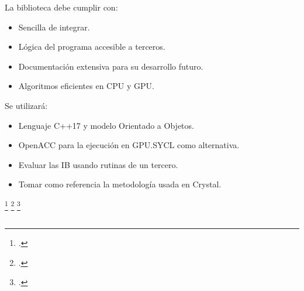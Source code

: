 \documentclass[dvisvgm,11pt,aspectratio=169]{beamer}
\begin{document}
\begin{frame}
\begin{columns}
\begin{column}{0.8\textwidth}
	La biblioteca debe cumplir con:
	\begin{itemize}
		\item Sencilla de integrar.
		\item Lógica del programa accesible a terceros. 
		\item Documentación extensiva para su desarrollo futuro.
		\item Algoritmos eficientes en CPU y GPU.
	\end{itemize}
	Se utilizará:
	\begin{itemize}
		\item Lenguaje C++17 y modelo Orientado a Objetos.
		\item OpenACC para la ejecución en GPU.\footnotemark  SYCL como alternativa.\footnotemark
		\item Evaluar las IB usando rutinas de un tercero.
		\item Tomar como referencia la metodología usada en Crystal.\footnotemark
	\end{itemize}
	
	\footcitetext{OpenACC2019}
	\footcitetext{SYCL2019}
	\footcitetext{Demichelis2008}
	\end{column}
	\begin{column}{0.2\textwidth}
	\centering
	

\end{column}
\end{columns}
\end{frame}
\end{document}
